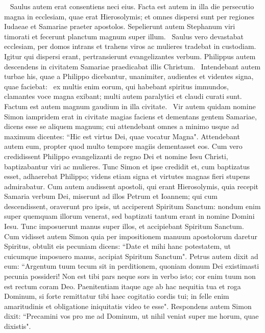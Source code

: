 \begin{biblechapter}   
\verse Saulus autem erat consentiens neci eius. Facta est autem in illa die persecutio magna in ecclesiam, quae erat Hierosolymis; et omnes dispersi sunt per regiones Iudaeae et Samariae praeter apostolos.
\verse Sepelierunt autem Stephanum viri timorati et fecerunt planctum magnum super illum.  
\verse Saulus vero devastabat ecclesiam, per domos intrans et trahens viros ac mulieres tradebat in custodiam. 
\verse Igitur qui dispersi erant, pertransierunt evangelizantes verbum. 
\verse Philippus autem descendens in civitatem Samariae praedicabat illis Christum.  
\verse Intendebant autem turbae his, quae a Philippo dicebantur, unanimiter, audientes et videntes signa, quae faciebat:  
\verse ex multis enim eorum, qui habebant spiritus immundos, clamantes voce magna exibant; multi autem paralytici et claudi curati sunt.  
\verse Factum est autem magnum gaudium in illa civitate.  
\verse Vir autem quidam nomine Simon iampridem erat in civitate magias faciens et dementans gentem Samariae, dicens esse se aliquem magnum; 
\verse cui attendebant omnes a minimo usque ad maximum dicentes: “Hic est virtus Dei, quae vocatur Magna". 
\verse Attendebant autem eum, propter quod multo tempore magiis dementasset eos. 
\verse Cum vero credidissent Philippo evangelizanti de regno Dei et nomine Iesu Christi, baptizabantur viri ac mulieres. 
\verse Tunc Simon et ipse credidit et, cum baptizatus esset, adhaerebat Philippo; videns etiam signa et virtutes magnas fieri stupens admirabatur. 
\verse Cum autem audissent apostoli, qui erant Hierosolymis, quia recepit Samaria verbum Dei, miserunt ad illos Petrum et Ioannem; 
\verse qui cum descendissent, oraverunt pro ipsis, ut acciperent Spiritum Sanctum: 
\verse nondum enim super quemquam illorum venerat, sed baptizati tantum erant in nomine Domini Iesu.  
\verse Tunc imposuerunt manus super illos, et accipiebant Spiritum Sanctum. 
\verse Cum vidisset autem Simon quia per impositionem manuum apostolorum daretur Spiritus, obtulit eis pecuniam 
\verse dicens: “Date et mihi hanc potestatem, ut cuicumque imposuero manus, accipiat Spiritum Sanctum". 
\verse Petrus autem dixit ad eum: “Argentum tuum tecum sit in perditionem, quoniam donum Dei existimasti pecunia possideri! 
\verse Non est tibi pars neque sors in verbo isto; cor enim tuum non est rectum coram Deo. 
\verse Paenitentiam itaque age ab hac nequitia tua et roga Dominum, si forte remittatur tibi haec cogitatio cordis tui; 
\verse in felle enim amaritudinis et obligatione iniquitatis video te esse". 
\verse Respondens autem Simon dixit: “Precamini vos pro me ad Dominum, ut nihil veniat super me horum, quae dixistis". 

\end{biblechapter}
